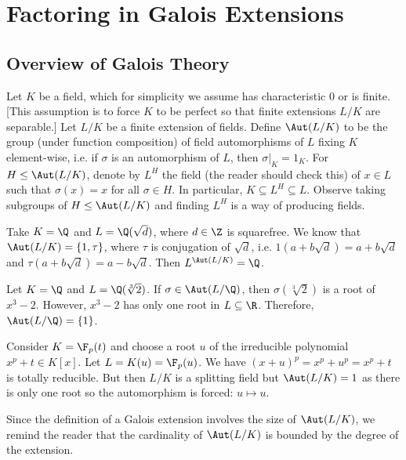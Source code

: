 
\section{Factoring in Galois Extensions}
\subsection{Overview of Galois Theory}

Let $K$ be a field, which for simplicity we assume has characteristic 0 or is finite. [This assumption is to force $K$ to be perfect so that finite extensions $L/K$ are separable.] Let $L/K$ be a finite extension of fields. Define $\Aut(L/K)$ to be the group (under function composition) of field automorphisms of $L$ fixing $K$ element-wise, i.e. if $\sigma$ is an automorphism of $L$, then $\sigma\big|_K=1_K$. For $H \leq \Aut(L/K)$, denote by $L^H$ the field (the reader should check this) of $x \in L$ such that $\sigma(x)=x$ for all $\sigma \in H$. In particular, $K \subseteq L^H \subseteq L$. Observe taking subgroups of $H \leq \Aut(L/K)$ and finding $L^H$ is a way of producing fields. 

\begin{ex}
Take $K=\Q$ and $L=\Q(\sqrt{d})$, where $d \in \Z$ is squarefree. We know that $\Aut(L/K)=\{1,\tau\}$, where $\tau$ is conjugation of $\sqrt{d}$, i.e. $1(a+b\sqrt{d})=a+b\sqrt{d}$ and $\tau(a+b\sqrt{d})= a-b\sqrt{d}$. Then $L^{\Aut(L/K)}=\Q$. \xqed
\end{ex}

\begin{ex}
Let $K=\Q$ and $L=\Q(\sqrt[3]{2})$. If $\sigma \in \Aut(L/\Q)$, then $\sigma(\sqrt[3]{2})$ is a root of $x^3-2$. However, $x^3-2$ has only one root in $L \subseteq \R$. Therefore, $\Aut(L/\Q)=\{1\}$. \xqed
\end{ex}

\begin{nex}
Consider $K=\F_p(t)$ and choose a root $u$ of the irreducible polynomial $x^p+t \in K[x]$. Let $L=K(u)=\F_p(u)$. We have $(x+u)^p=x^p+u^p=x^p+t$ is totally reducible. But then $L/K$ is a splitting field but $\Aut(L/K)=1$ as there is only one root so the automorphism is forced: $u \mapsto u$. \xqed
\end{nex}

Since the definition of a Galois extension involves the size of $\Aut(L/K)$, we remind the reader that the cardinality of $\Aut(L/K)$ is bounded by the degree of the extension. 

